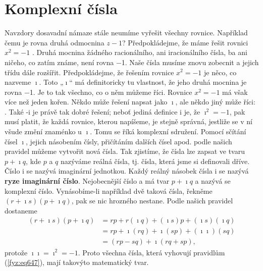   \section{Komplexní čísla}\label{fyz:IchapXXIIsecV}
    Navzdory dosavadní námaze stále neumíme vyřešit všechny rovnice. Například čemu je rovna druhá
    odmocnina \(z-1\)? Předpokládejme, že máme řešit rovnici \(x^2 =-1\) . Druhá mocnina žádného
    racionálního, ani iracionálního čísla, ba ani ničeho, co zatím známe, není rovna \num{-1}. Naše
    čísla musíme znovu zobecnit a jejich třídu dále rozšířit. Předpokládejme, že řešením rovnice
    \(x^2 = -1\) je něco, co nazveme \(\imath\). Toto „\(\imath\)“ má deﬁnitoricky tu vlastnost, že
    jeho druhá mocnina je rovna \num{-1}. Je to tak všechno, co o něm můžeme říci. Rovnice \(x^2 =
    -1\) má však více než jeden kořen. Někdo může řešení napsat jako \(\imath\), ale někdo jiný může
    říci: .
    Také \num{-i} je právě tak dobré řešení; neboť jediná deﬁnice \num{i} je, že \(\imath^2 = -1\),
    pak musí platit, že každá rovnice, kterou napíšeme, je stejně správná, jestliže se v ní všude
    změní znaménko u \(\imath\). Tomu se říká komplexní sdružení. Pomocí sčítání čísel \(\imath\),
    jejich násobením čísly, přičítáním dalších čísel apod. podle našich pravidel můžeme vytvořit
    nová čísla. Tak zjistíme, že čísla lze zapsat ve tvaru \(p + \imath q\), kde \(p\) a \(q\)
    nazýváme reálná čísla, tj. čísla, která jsme si deﬁnovali dříve. Číslo i se nazývá imaginární
    jednotkou. Každý reálný násobek čísla i se nazývá \textbf{ryze imaginární číslo}. Nejobecnější
    číslo a má tvar \(p + \imath q\) a nazývá se komplexní číslo. Vynásobíme-li například dvě taková
    čísla, řekněme \((r + \imath s)(p + \imath q)\), pak se nic hrozného nestane. Podle našich
    pravidel dostaneme
    \begin{align}\label{fyz:eq697}
      (r+\imath s)(p+\imath q)&=rp+r(\imath q)+(\imath s)p+(\imath s)(\imath q)   \nonumber \\
                              &=rp+\imath(rq)+\imath(sp)+(\imath\imath)(sq)       \nonumber \\
                              &=(rp−sq)+\imath(rq+sp),
    \end{align}
    protože \(\imath\imath = \imath^2 = -1\). Proto všechna čísla, která vyhovují pravidlům
    (\ref{fyz:eq647}), mají takovýto matematický tvar.

